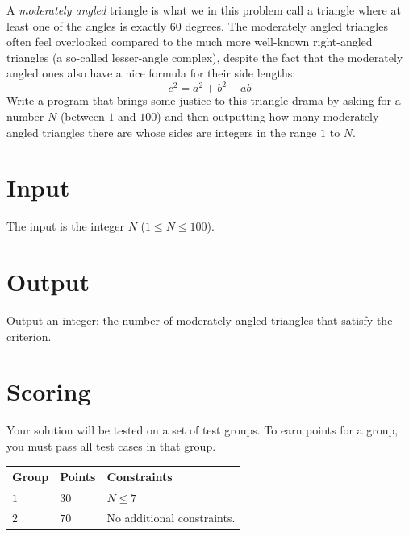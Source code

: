 A \emph{moderately angled} triangle is what we in this problem call a triangle where at least one of the angles is exactly 60 degrees. The moderately angled triangles often feel overlooked compared to the much more well-known right-angled triangles (a so-called lesser-angle complex), despite the fact that the moderately angled ones also have a nice formula for their side lengths:
\begin{equation*}
	c^2 = a^2 + b^2 - ab
\end{equation*}
Write a program that brings some justice to this triangle drama by asking for a number $N$ (between $1$ and $100$) and then outputting how many moderately angled triangles there are whose sides are integers in the range $1$ to $N$.

\section*{Input}
The input is the integer $N$ ($1 \leq N \leq 100$).

\section*{Output}
Output an integer: the number of moderately angled triangles that satisfy the criterion.

\section*{Scoring}
Your solution will be tested on a set of test groups.
To earn points for a group, you must pass all test cases in that group.

\noindent
\begin{tabular}{| l | l | p{12cm} |}
  \hline
  \textbf{Group} & \textbf{Points} & \textbf{Constraints} \\ \hline
  $1$    & $30$          & $N \leq 7$  \\ \hline
  $2$    & $70$          & No additional constraints.  \\ \hline
\end{tabular}

